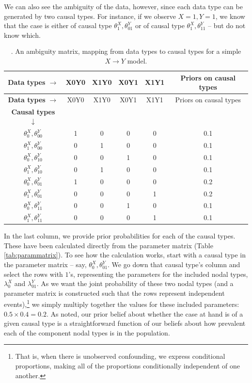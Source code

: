 \documentclass[
  12pt,
]{book}
\begin{document}
We can also see the ambiguity of the data, however, since each data type can be generated by two causal types. For instance, if we observe \(X=1, Y=1\), we know that the case is either of causal type \(\theta^X_1,\theta^Y_{01}\) or of causal type \(\theta^X_1,\theta^Y_{11}\) -- but do not know which.

\begin{longtable}[]{@{}cccccc@{}}
\caption{\label{tab:ambigmatrix}. An ambiguity matrix, mapping from data types to causal types for a simple \(X \rightarrow Y\) model.}\tabularnewline
\toprule
\textbf{Data types} \(\rightarrow\) & X0Y0 & X1Y0 & X0Y1 & X1Y1 & Priors on causal types\tabularnewline
\midrule
\endfirsthead
\toprule
\textbf{Data types} \(\rightarrow\) & X0Y0 & X1Y0 & X0Y1 & X1Y1 & Priors on causal types\tabularnewline
\midrule
\endhead
\textbf{Causal types} \(\downarrow\) & & & & &\tabularnewline
\(\theta^X_0,\theta^Y_{00}\) & 1 & 0 & 0 & 0 & 0.1\tabularnewline
\(\theta^X_1,\theta^Y_{00}\) & 0 & 1 & 0 & 0 & 0.1\tabularnewline
\(\theta^X_0,\theta^Y_{10}\) & 0 & 0 & 1 & 0 & 0.1\tabularnewline
\(\theta^X_1,\theta^Y_{10}\) & 0 & 1 & 0 & 0 & 0.1\tabularnewline
\(\theta^X_0,\theta^Y_{01}\) & 1 & 0 & 0 & 0 & 0.2\tabularnewline
\(\theta^X_1,\theta^Y_{01}\) & 0 & 0 & 0 & 1 & 0.2\tabularnewline
\(\theta^X_0,\theta^Y_{11}\) & 0 & 0 & 1 & 0 & 0.1\tabularnewline
\(\theta^X_1,\theta^Y_{11}\) & 0 & 0 & 0 & 1 & 0.1\tabularnewline
\bottomrule
\end{longtable}

In the last column, we provide prior probabilities for each of the causal types. These have been calculated directly from the parameter matrix (Table \ref{tab:parammatrix}). To see how the calculation works, start with a causal type in the parameter matrix -- say, \(\theta^X_0,\theta^Y_{01}\). We go down that causal type's column and select the rows with \(1\)'s, representing the parameters for the included nodal types, \(\lambda^X_0\) and \(\lambda^Y_{01}\). As we want the joint probability of these two nodal types (and a parameter matrix is constructed such that the rows represent independent events),\footnote{That is, when there is unobserved confounding, we express conditional proportions, making all of the proportions conditionally independent of one another.} we simply multiply together the values for these included parameters: \(0.5 \times 0.4 = 0.2\). As noted, our prior belief about whether the case at hand is of a given causal type is a straightforward function of our beliefs about how prevalent each of the component nodal types is in the population.
\end{document}
